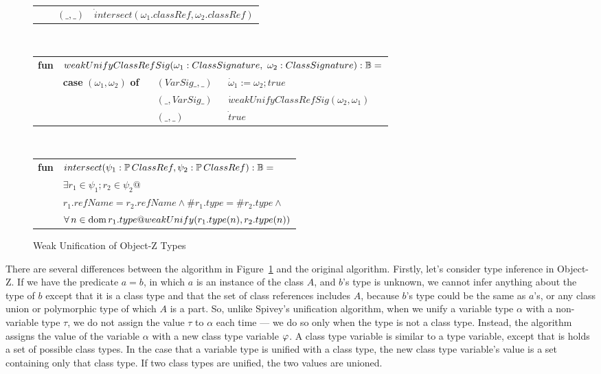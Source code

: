 \begin{figure}[!t]
\begin{tabular}{llll}
      & & $(\_,\_)$ & $\dot intersect(\omega_1.classRef, \omega_2.classRef)$
\end{tabular}
\vspace{2mm}\\
\begin{tabular}{llll}
  {\bf fun} &
  \multicolumn{3}{l}{$weakUnifyClassRefSig(\omega_1:ClassSignature,~\omega_2:ClassSignature) : {\mathbb B} =$}\\
  & {\bf case} $(\omega_1,\omega_2)$ {\bf of} & $(VarSig \_, \_ )$
  & $\dot \omega_1 := \omega_2; true$\\
      & & $(\_, VarSig \_)$ & $\dot weakUnifyClassRefSig(\omega_2,\omega_1)$\\
      & & $(\_, \_)$ & $\dot true$\\
\end{tabular}
\vspace{2mm}\\
\begin{tabular}{ll}
  {\bf fun} & $intersect(\psi_1:\power ClassRef, \psi_2:\power ClassRef) : \bool =$\\
   & \quad\quad$\exists r_1 \in \psi_1; r_2 \in \psi_2 @$\\
   & \quad\quad\quad\quad $r_1.refName = r_2.refName \land \#r_1.type = \#r_2.type \land$\\
   & \quad\quad\quad\quad $\forall n \in \dom r_1.type @
       weakUnify(r_1.type(n), r_2.type(n))$
\end{tabular}
\caption{Weak Unification of Object-Z Types}
\label{weakUnify}
\end{figure}

There are several differences between the algorithm in
Figure~\ref{weakUnify} and the original algorithm. Firstly, let's
consider type inference in Object-Z. If we have the predicate $a = b$,
in which $a$ is an instance of the class $A$, and $b$'s type is
unknown, we cannot infer anything about the type of $b$ except that it
is a class type and that the set of class references includes $A$,
because $b$'s type could be the same as $a$'s, or any class union or
polymorphic type of which $A$ is a part. So, unlike Spivey's
unification algorithm, when we unify a variable type $\alpha$ with a
non-variable type $\tau$, we do not assign the value $\tau$ to
$\alpha$ each time --- we do so only when the type is not a class
type. Instead, the algorithm assigns the value of the variable
$\alpha$ with a new class type variable $\varphi$. A class type
variable is similar to a type variable, except that is holds a set of
possible class types. In the case that a variable type is unified with
a class type, the new class type variable's value is a set containing
only that class type. If two class types are unified, the two values
are unioned.
  
